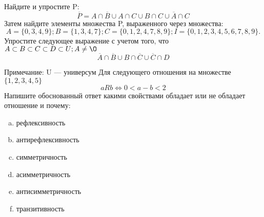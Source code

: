 \documentclass[10pt]{exam}
\begin{document}
\begin{questions}
\question
Найдите и упростите P:
\begin{equation*}
\overline{P} = A \cap \overline{B} \cup A \cap C \cup B \cap C \cup \overline{A} \cap C
\end{equation*}
Затем найдите элементы множества P, выраженного через множества:
\begin{equation*}
A = \{0, 3, 4, 9\}; 
B = \{1, 3, 4, 7\};
C = \{0, 1, 2, 4, 7, 8, 9\};
I = \{0, 1, 2, 3, 4, 5, 6, 7, 8, 9\}.
\end{equation*}\question
Упростите следующее выражение с учетом того, что $A\subset B \subset C \subset D \subset U; A \neq \O$
\begin{equation*}
\overline{A} \cap \overline{B} \cup B \cap \overline{C} \cup \overline{C} \cap D
\end{equation*}

Примечание: U — универсум\question
Для следующего отношения на множестве $\{1, 2, 3, 4, 5\}$ 
\begin{equation*}
aRb \iff 0 < a-b<2
\end{equation*}
Напишите обоснованный ответ какими свойствами обладает или не обладает отношение и почему:   
\begin{enumerate} [a)]\setcounter{enumi}{0}
\item рефлексивность
\item антирефлексивность
\item симметричность
\item асимметричность
\item антисимметричность
\item транзитивность
\end{enumerate}


\end{questions}
\end{document}
